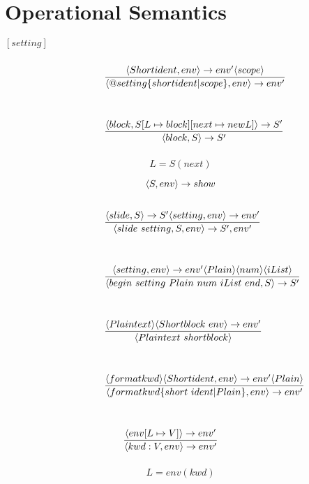\chapter{Operational Semantics}

$[setting]$
\[ \condinfrule{\langle Shortident, env \rangle \ra env' \langle scope \rangle} { \langle @ setting \{ shortident | scope \}, env \rangle \ra env'}{} \]

\noindent{$[slide]$}
\[ \condinfrule{\langle block, S[L \mapsto block] [next \mapsto new L] \rangle \ra S'} { \langle block, S \rangle \ra S'}{} \]
\[ L = S(next)\]

\noindent{$[slideshow]$}
\[ \langle S, env \rangle \rightarrow show \]

\noindent{$[laks]$}
\[ \condinfrule{\langle slide, S \rangle \ra S' \langle setting, env \rangle \ra env'} { \langle slide~setting, S, env \rangle \ra S', env'}{} \]

\noindent{$[Block]$}
\[ \condinfrule{\langle setting, env \rangle \ra env' \langle Plain \rangle \langle num \rangle \langle iList \rangle} { \langle begin~setting~Plain~num~iList~end, S \rangle \ra S'}{} \]

\noindent{$[Plain]$}
\[ \condinfrule{\langle Plaintext \rangle \langle Shortblock~env \rangle \ra env'} { \langle Plaintext~shortblock \rangle }{} \]

\noindent{$[Shortblock]$}
\[ \condinfrule{\langle formatkwd \rangle \langle Shortident, env \rangle \ra env' \langle Plain \rangle} { \langle formatkwd \{short~ident | Plain\}, env \rangle \ra env'}{} \]

\noindent{$[Shortident]$}
\[ \condinfrule{\langle env [L \mapsto V] \rangle \ra env'} { \langle kwd : V, env \rangle \ra env'}{} \]
\[ L = env(kwd)\]